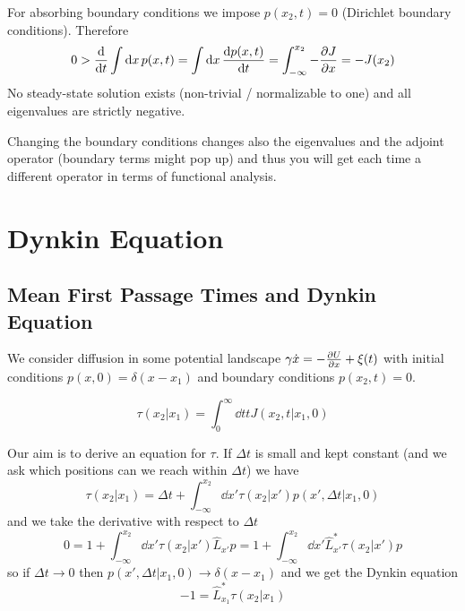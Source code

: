 \documentclass{/home/ben/Templates/notebook}
\begin{document}
	For absorbing boundary conditions we impose $p(x_2,t) = 0$ (Dirichlet boundary conditions). Therefore
	\begin{equation}
	0 > \dv{t} \int \dd{x} p(x,t) = \int \dd{x} \dv{p(x,t)}{t} = \int_{-\infty}^{x_2} -\pdv{J}{x} = -J(x_2)
	\end{equation}
	No steady-state solution exists (non-trivial / normalizable to one) and all eigenvalues are strictly negative.
	
	\begin{remark}
		Changing the boundary conditions changes also the eigenvalues and the adjoint operator (boundary terms might pop up) and thus you will get each time a different operator in terms of functional analysis. 
	\end{remark}
	
	\chapter{Dynkin Equation}
	
	\section{Mean First Passage Times and Dynkin Equation}
	
	We consider diffusion in some potential landscape $\gamma \dot{x} = - \pdv{U}{x} + \xi(t)$ with initial conditions $p(x,0) = \delta(x-x_1)$ and boundary conditions $p(x_2,t) = 0$.
	
	\begin{theorem}
		\begin{equation}
		\tau(x_2|x_1) = \int_0^{\infty} \dd{t} t J(x_2,t|x_1,0)
		\end{equation}
	\end{theorem}
	
	Our aim is to derive an equation for $\tau$. If $\Delta t$ is small and kept constant (and we ask which positions can we reach within $\Delta t$) we have
	\begin{equation*}
		\tau(x_2|x_1) = \Delta t + \int_{-\infty}^{x_2} \dd{x'} \tau(x_2|x') p(x',\Delta t|x_1,0)
	\end{equation*}
	and we take the derivative with respect to $\Delta t$
	\begin{equation*}
		0 = 1 + \int_{-\infty}^{x_2} \dd{x'} \tau(x_2|x') \hat{L}_{x'} p = 1 + \int_{-\infty}^{x_2} \dd{x'} \hat{L}^*_{x'} \tau(x_2|x') p
	\end{equation*}
	so if $\Delta t \to 0$ then $p(x',\Delta t|x_1,0) \to \delta(x-x_1)$
	and we get the Dynkin equation
	\begin{equation}
	-1 = \hat{L}^*_{x_1} \tau(x_2|x_1)
	\end{equation}
	
\end{document}
